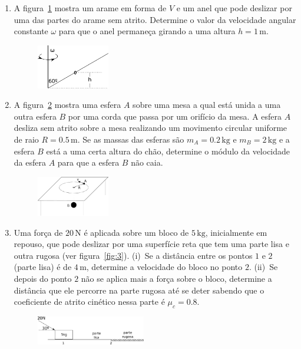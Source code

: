 \documentclass[twocolumn=on,DIV=calc]{scrartcl}
\newcommand{\un}[1]{\mathrm{#1}}
\begin{document}
\begin{enumerate}
\item A figura~\ref{fig:1} mostra um arame em forma de $V$ e um anel
  que pode deslizar por uma das partes do arame sem atrito. Determine
  o valor da velocidade angular constante $\omega$ para que o anel
  permaneça girando a uma altura $h=1\,\un{m}$.
  \begin{figure}[ht]
    \centering
    \includegraphics[width=0.3\textwidth,keepaspectratio]{lista5-questao1.pdf}
    \caption{}
    \label{fig:1}
  \end{figure}
\item A figura~\ref{fig:2} mostra uma esfera $A$ sobre uma mesa a qual
  está unida a uma outra esfera $B$ por uma corda que passa por um
  orifício da mesa. A esfera $A$ desliza sem atrito sobre a mesa
  realizando um movimento circular uniforme de raio
  $R=0.5\,\un{m}$. Se as massas das esferas são $m_A=0.2\,\un{kg}$ e
  $m_B=2\,\un{kg}$ e a esfera $B$ está a uma certa altura do chão,
  determine o módulo da velocidade da esfera $A$ para que a esfera $B$
  não caia.
  \begin{figure}[ht]
    \centering
    \includegraphics[width=0.3\textwidth,keepaspectratio]{lista5-questao2.pdf}
    \caption{}
    \label{fig:2}
  \end{figure}
\item Uma força de $20\,\un N$ é aplicada sobre um bloco de
  $5\,\un{kg}$, inicialmente em repouso, que pode deslizar por uma
  superfície reta que tem uma parte lisa e outra rugosa (ver
  figura~\ref{fig:3}). (i)~Se a distância entre os pontos $1$ e $2$
  (parte lisa) é de $4\,\un{m}$, determine a velocidade do bloco no
  ponto $2$. (ii)~Se depois do ponto $2$ não se aplica mais a força
  sobre o bloco, determine a distância que ele percorre na parte
  rugosa até se deter sabendo que o coeficiente de atrito cinético
  nessa parte é $\mu_c=0.8$.
  \begin{figure}[ht]
    \centering
    \includegraphics[width=0.45\textwidth,keepaspectratio]{lista5-questao3.pdf}

\end{figure}
\end{enumerate}
\end{document}
